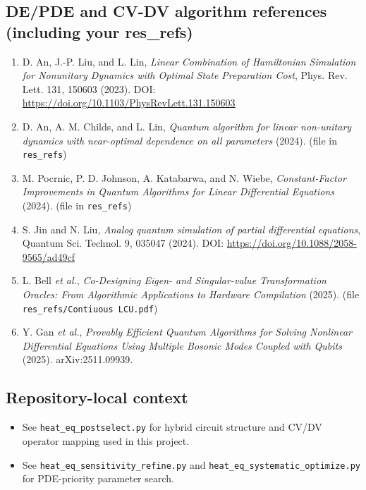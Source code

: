 \documentclass[11pt]{article}
\begin{document}
\subsection*{DE/PDE and CV-DV algorithm references (including your res\_refs)}
\begin{enumerate}
\item D. An, J.-P. Liu, and L. Lin, \emph{Linear Combination of Hamiltonian Simulation for Nonunitary Dynamics with Optimal State Preparation Cost}, Phys. Rev. Lett. 131, 150603 (2023). DOI: \url{https://doi.org/10.1103/PhysRevLett.131.150603}
\item D. An, A. M. Childs, and L. Lin, \emph{Quantum algorithm for linear non-unitary dynamics with near-optimal dependence on all parameters} (2024). (file in \texttt{res\_refs})
\item M. Pocrnic, P. D. Johnson, A. Katabarwa, and N. Wiebe, \emph{Constant-Factor Improvements in Quantum Algorithms for Linear Differential Equations} (2024). (file in \texttt{res\_refs})
\item S. Jin and N. Liu, \emph{Analog quantum simulation of partial differential equations}, Quantum Sci. Technol. 9, 035047 (2024). DOI: \url{https://doi.org/10.1088/2058-9565/ad49cf}
\item L. Bell \emph{et al.}, \emph{Co-Designing Eigen- and Singular-value Transformation Oracles: From Algorithmic Applications to Hardware Compilation} (2025). (file \texttt{res\_refs/Contiuous LCU.pdf})
\item Y. Gan \emph{et al.}, \emph{Provably Efficient Quantum Algorithms for Solving Nonlinear Differential Equations Using Multiple Bosonic Modes Coupled with Qubits} (2025). arXiv:2511.09939.
\end{enumerate}

\subsection*{Repository-local context}
\begin{itemize}
\item See \texttt{heat\_eq\_postselect.py} for hybrid circuit structure and CV/DV operator mapping used in this project.
\item See \texttt{heat\_eq\_sensitivity\_refine.py} and \texttt{heat\_eq\_systematic\_optimize.py} for PDE-priority parameter search.
\end{itemize}
\end{document}
